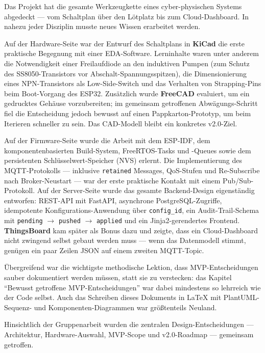 \documentclass[a4paper,12pt]{article}
\begin{document}
Das Projekt hat die gesamte Werkzeugkette eines cyber-physischen
Systems abgedeckt --- vom Schaltplan über den Lötplatz bis zum
Cloud-Dashboard. In nahezu jeder Disziplin musste neues Wissen
erarbeitet werden.

Auf der Hardware-Seite war der Entwurf des Schaltplans in
\textbf{KiCad} die erste praktische Begegnung mit einer
EDA-Software. Lerninhalte waren unter anderem die Notwendigkeit
einer Freilaufdiode an den induktiven Pumpen (zum Schutz des
SS8050-Transistors vor Abschalt-Spannungsspitzen), die
Dimensionierung eines NPN-Transistors als Low-Side-Switch und das
Verhalten von Strapping-Pins beim Boot-Vorgang des ESP32.
Zusätzlich wurde \textbf{FreeCAD} evaluiert, um ein gedrucktes
Gehäuse vorzubereiten; im gemeinsam getroffenen Abwägungs-Schritt
fiel die Entscheidung jedoch bewusst auf einen Pappkarton-Prototyp,
um beim Iterieren schneller zu sein. Das CAD-Modell bleibt ein
konkretes v2.0-Ziel.

Auf der Firmware-Seite wurde die Arbeit mit dem ESP-IDF,
dem komponentenbasierten Build-System, FreeRTOS-Tasks und -Queues
sowie dem persistenten Schlüsselwert-Speicher (NVS) erlernt.
Die Implementierung des MQTT-Protokolls --- inklusive
\texttt{retained} Messages, QoS-Stufen und Re-Subscribe nach
Broker-Neustart --- war der erste praktische Kontakt mit einem
Pub/Sub-Protokoll. Auf der Server-Seite wurde das gesamte
Backend-Design eigenständig entworfen: REST-API mit FastAPI,
asynchrone PostgreSQL-Zugriffe, idempotente
Konfigurations-Anwendung über \texttt{config\_id}, ein
Audit-Trail-Schema mit \texttt{pending} $\to$ \texttt{pushed} $\to$
\texttt{applied} und ein Jinja2-gerendertes Frontend.
\textbf{ThingsBoard} kam später als Bonus dazu und zeigte, dass ein
Cloud-Dashboard nicht zwingend selbst gebaut werden muss --- wenn
das Datenmodell stimmt, genügen ein paar Zeilen JSON auf einem
zweiten MQTT-Topic.

Übergreifend war die wichtigste methodische Lektion, dass
MVP-Entscheidungen sauber dokumentiert werden müssen, statt sie zu
verstecken: das Kapitel "`Bewusst getroffene MVP-Entscheidungen"'
war dabei mindestens so lehrreich wie der Code selbst. Auch das
Schreiben dieses Dokuments in \LaTeX{} mit PlantUML-Sequenz- und
Komponenten-Diagrammen war größtenteils Neuland.

Hinsichtlich der Gruppenarbeit wurden die zentralen
Design-Entscheidungen --- Architektur, Hardware-Auswahl, MVP-Scope
und v2.0-Roadmap --- gemeinsam getroffen.

\appendix
\newpage
\end{document}
